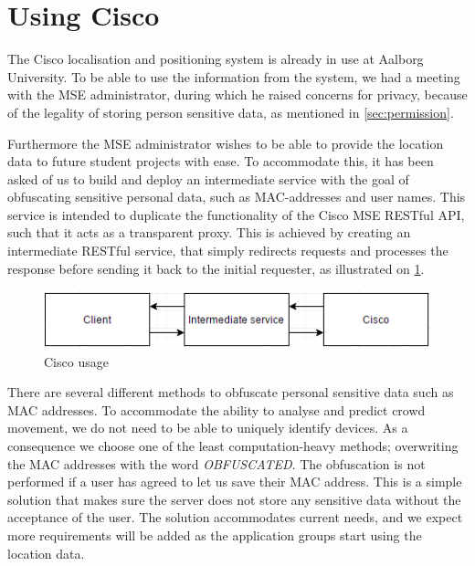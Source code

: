 \section{Using Cisco}\label{sec:cisco_usage}
The Cisco localisation and positioning system is already in use at Aalborg University. To be able to use the information from the system, we had a meeting with the MSE administrator, during which he raised concerns for privacy, because of the legality of storing person sensitive data, as mentioned in \cref{sec:permission}. 

Furthermore the MSE administrator wishes to be able to provide the location data to future student projects with ease. To accommodate this, it has been asked of us to build and deploy an intermediate service with the goal of obfuscating sensitive personal data, such as MAC-addresses and user names. This service is intended to duplicate the functionality of the Cisco MSE RESTful API, such that it acts as a transparent proxy. This is achieved by creating an intermediate RESTful service, that simply redirects requests and processes the response before sending it back to the initial requester, as illustrated on \cref{fig:cisco_usage}.

\begin{figure}[ht]
	\begin{center}
	\includegraphics[scale=0.9]{graphics/cisco_usage.png}
	\caption{Cisco usage}
	\label{fig:cisco_usage}
	\end{center} 
\end{figure}

There are several different methods to obfuscate personal sensitive data such as MAC addresses. To accommodate the ability to analyse and predict crowd movement, we do not need to be able to uniquely identify devices. As a consequence we choose one of the least computation-heavy methods; overwriting the MAC addresses with the word \emph{OBFUSCATED}. The obfuscation is not performed if a user has agreed to let us save their MAC address.
This is a simple solution that makes sure the server does not store any sensitive data without the acceptance of the user. The solution accommodates current needs, and we expect more requirements will be added as the application groups start using the location data.

